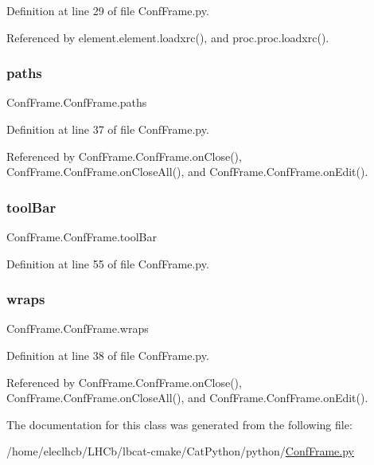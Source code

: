 Definition at line 29 of file Conf\+Frame.\+py.



Referenced by element.\+element.\+loadxrc(), and proc.\+proc.\+loadxrc().

\mbox{\label{classConfFrame_1_1ConfFrame_a7fa64be7e4b3602d7b4ce881b87a0d5e}} 
\subsubsection{\texorpdfstring{paths}{paths}}
{\footnotesize\ttfamily Conf\+Frame.\+Conf\+Frame.\+paths}



Definition at line 37 of file Conf\+Frame.\+py.



Referenced by Conf\+Frame.\+Conf\+Frame.\+on\+Close(), Conf\+Frame.\+Conf\+Frame.\+on\+Close\+All(), and Conf\+Frame.\+Conf\+Frame.\+on\+Edit().

\mbox{\label{classConfFrame_1_1ConfFrame_ae34c2fb369a3a0b3cff4724f1c8e8a01}} 
\subsubsection{\texorpdfstring{tool\+Bar}{toolBar}}
{\footnotesize\ttfamily Conf\+Frame.\+Conf\+Frame.\+tool\+Bar}



Definition at line 55 of file Conf\+Frame.\+py.

\mbox{\label{classConfFrame_1_1ConfFrame_a787b2c045a34b615b110e2cdf98c4c49}} 
\subsubsection{\texorpdfstring{wraps}{wraps}}
{\footnotesize\ttfamily Conf\+Frame.\+Conf\+Frame.\+wraps}



Definition at line 38 of file Conf\+Frame.\+py.



Referenced by Conf\+Frame.\+Conf\+Frame.\+on\+Close(), Conf\+Frame.\+Conf\+Frame.\+on\+Close\+All(), and Conf\+Frame.\+Conf\+Frame.\+on\+Edit().



The documentation for this class was generated from the following file\+:\begin{DoxyCompactItemize}
\item 
/home/eleclhcb/\+L\+H\+Cb/lbcat-\/cmake/\+Cat\+Python/python/\hyperlink{ConfFrame_8py}{Conf\+Frame.\+py}\end{DoxyCompactItemize}
